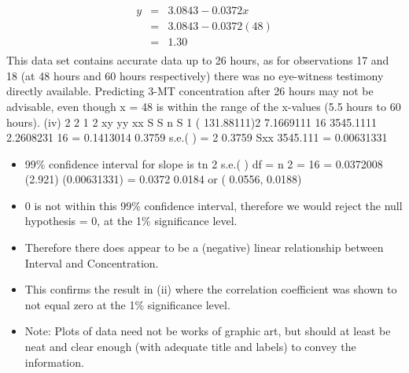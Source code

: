 \documentclass[a4paper,12pt]{article}
\begin{document}
\begin{eqnarray*}
y &=& 3.0843 -  0.0372 x\\
&=& 3.0843 - 0.0372 (48)\\
&=& 1.30\\
\end{eqnarray*}
This data set contains accurate data up to 26 hours, as for observations 17 and 18 (at 48 hours and 60 hours respectively) there was no eye-witness testimony directly available. Predicting 3-MT concentration after 26 hours may not be
advisable, even though x = 48 is within the range of the x-values (5.5 hours to 60 hours).
(iv)
2
2 1
2
xy
yy
xx
S
S
n S
1 ( 131.88111)2
7.1669111
16 3545.1111
2.2608231
16
= 0.1413014
0.3759
s.e.( ) =
2 0.3759
Sxx 3545.111
= 0.00631331
\begin{itemize}
\item 99\% confidence interval for slope is tn 2 s.e.( ) df = n 2 = 16
= 0.0372008 (2.921) (0.00631331)
= 0.0372 0.0184
or ( 0.0556, 0.0188)
\item  0 is not within this 99\% confidence interval, therefore we would reject the
null hypothesis = 0, at the 1\% significance level.
\item Therefore there does appear to be a (negative) linear relationship between
Interval and Concentration.
\item This confirms the result in (ii) where the correlation coefficient was shown to
not equal zero at the 1\% significance level.
\item Note: Plots of data need not be works of graphic art, but should at least be neat and clear
enough (with adequate title and labels) to convey the information.
\end{itemize}
\end{document}
